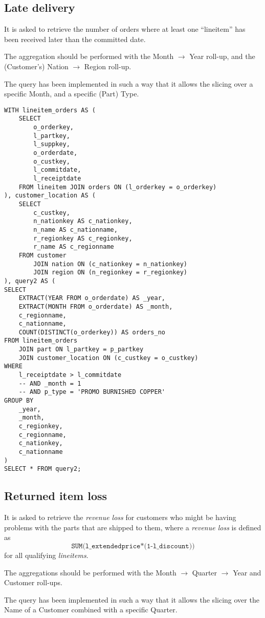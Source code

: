 \subsection{Late delivery}

It is asked to retrieve the number of orders where at least one ``lineitem'' has been received later than the committed date.

The aggregation should be performed with the Month $\rightarrow$ Year roll-up, and the (Customer's) Nation $\rightarrow$ Region roll-up.

The query has been implemented in such a way that it allows the slicing over a specific Month, and a specific (Part) Type.

\begin{lstlisting}
WITH lineitem_orders AS (
	SELECT
		o_orderkey, 
		l_partkey, 
		l_suppkey, 
		o_orderdate, 
		o_custkey,
		l_commitdate,
		l_receiptdate
	FROM lineitem JOIN orders ON (l_orderkey = o_orderkey)
), customer_location AS (
	SELECT 
		c_custkey, 
		n_nationkey AS c_nationkey, 
		n_name AS c_nationname, 
		r_regionkey AS c_regionkey, 
		r_name AS c_regionname 
	FROM customer 
		JOIN nation ON (c_nationkey = n_nationkey)
		JOIN region ON (n_regionkey = r_regionkey)
), query2 AS (
SELECT 
	EXTRACT(YEAR FROM o_orderdate) AS _year,
	EXTRACT(MONTH FROM o_orderdate) AS _month,
	c_regionname,
	c_nationname,
	COUNT(DISTINCT(o_orderkey)) AS orders_no
FROM lineitem_orders
	JOIN part ON l_partkey = p_partkey
	JOIN customer_location ON (c_custkey = o_custkey)
WHERE 
	l_receiptdate > l_commitdate
	-- AND _month = 1
	-- AND p_type = 'PROMO BURNISHED COPPER'
GROUP BY
	_year,
	_month,
	c_regionkey,
	c_regionname,
	c_nationkey,
	c_nationname
)
SELECT * FROM query2;
\end{lstlisting}


\subsection{Returned item loss}

It is asked to retrieve the \textit{revenue loss} for customers who might be having problems with the parts that are shipped to them, where a \textit{revenue loss} is defined as
$$ \texttt{SUM(l\_extendedprice*(1-l\_discount))}$$
for all qualifying \textit{lineitems}.

The aggregations should be performed with the Month $\rightarrow$ Quarter $\rightarrow$ Year and Customer roll-ups.

The query has been implemented in such a way that it allows the slicing over the Name of a Customer combined with a specific Quarter.

